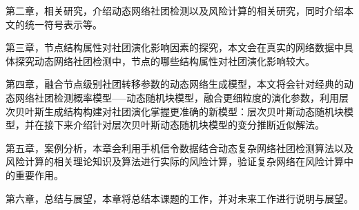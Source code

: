 第二章，相关研究，介绍动态网络社团检测以及风险计算的相关研究，同时介绍本文的统一符号表示等。

第三章，节点结构属性对社团演化影响因素的探究，本文会在真实的网络数据中具体探究动态网络社团检测中，节点的哪些结构属性对社团演化影响较大。

第四章，融合节点级别社团转移参数的动态网络生成模型，本文将会针对经典的动态网络社团检测概率模型-----动态随机块模型，融合更细粒度的演化参数，利用层次贝叶斯生成结构构建对社团演化掌握更准确的新模型：层次贝叶斯动态随机块模型，并在接下来介绍针对层次贝叶斯动态随机块模型的变分推断近似解法。

第五章，案例分析，本章会利用手机信令数据结合动态复杂网络社团检测算法以及风险计算的相关理论知识及算法进行实际的风险计算，验证复杂网络在风险计算中的重要作用。

第六章，总结与展望，本章将总结本课题的工作，并对未来工作进行说明与展望。

